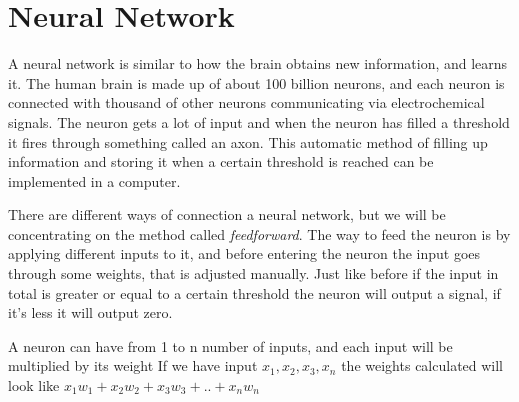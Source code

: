 \section{Neural Network}

A neural network is similar to how the brain obtains new information, and learns it. The human brain is made up of about 100 billion neurons, and each neuron is connected with thousand of other neurons communicating via electrochemical signals. The neuron gets a lot of input and when the neuron has filled a threshold it fires through something called an axon. This automatic method of filling up information and storing it when a certain threshold is reached can be implemented in a computer.



There are different ways of connection a neural network, but we will be concentrating on the method called \textit{feedforward}. The way to feed the neuron is by applying different inputs to it, and before entering the neuron the input goes through some weights, that is adjusted manually. Just like before if the input in total is greater or equal to a certain threshold the neuron will output a signal, if it's less it will output zero.


A neuron can have from 1 to n number of inputs, and each input will be multiplied by its weight
If we have input $x_1, x_2, x_3, x_n$ the weights calculated will look like $x_1 w_1 + x_2 w_2 + x_3 w_3 + .. +  x_n w_n$



